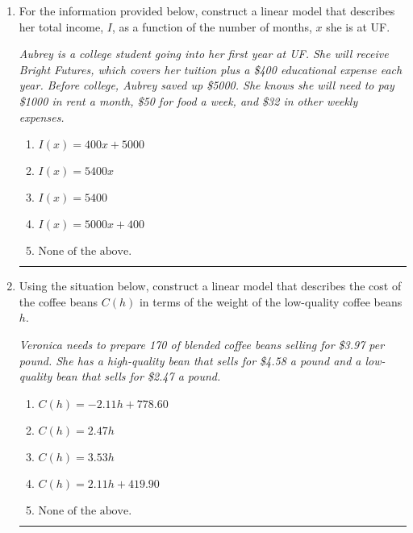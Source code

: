 \documentclass[14pt]{extbook}
\newcommand{\litem}[1]{\item#1\hspace*{-1cm}\rule{\textwidth}{0.4pt}}
\begin{document}
\begin{enumerate}
{\begin{enumerate}[label=\Alph*.]
\end{enumerate} }
\litem{
For the information provided below, construct a linear model that describes her total income, $I$, as a function of the number of months, $x$ she is at UF.
\begin{center}
    \textit{ Aubrey is a college student going into her first year at UF. She will receive Bright Futures, which covers her tuition plus a \$400 educational expense each year. Before college, Aubrey saved up \$5000. She knows she will need to pay \$1000 in rent a month, \$50 for food a week, and \$32 in other weekly expenses. }
\end{center}
\begin{enumerate}[label=\Alph*.]
\item \( I(x) = 400 x + 5000 \)
\item \( I(x) = 5400 x \)
\item \( I(x) = 5400 \)
\item \( I(x) = 5000 x + 400 \)
\item \( \text{None of the above.} \)

\end{enumerate} }
\litem{
Using the situation below, construct a linear model that describes the cost of the coffee beans $C(h)$ in terms of the weight of the low-quality coffee beans $h$.
\begin{center}
    \textit{ Veronica needs to prepare 170 of blended coffee beans selling for \$3.97 per pound. She has a high-quality bean that sells for \$4.58 a pound and a low-quality bean that sells for \$2.47 a pound. }
\end{center}
\begin{enumerate}[label=\Alph*.]
\item \( C(h) = -2.11 h + 778.60 \)
\item \( C(h) = 2.47 h \)
\item \( C(h) = 3.53 h \)
\item \( C(h) = 2.11 h + 419.90 \)
\item \( \text{None of the above.} \)

\end{enumerate} }
\end{enumerate}
\end{document}
